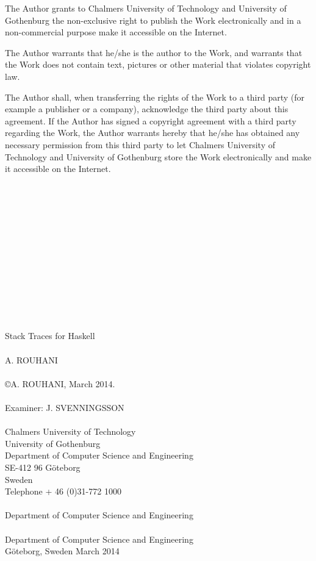 The Author grants to Chalmers University of Technology and University of
Gothenburg the non-exclusive right to publish the Work electronically
and in a non-commercial purpose make it accessible on the Internet.

The Author warrants that he/she is the author to the Work, and warrants
that the Work does not contain text, pictures or other material that
violates copyright law.

The Author shall, when transferring the rights of the Work to a third
party (for example a publisher or a company), acknowledge the third
party about this agreement. If the Author has signed a copyright
agreement with a third party regarding the Work, the Author warrants
hereby that he/she has obtained any necessary permission from this
third party to let Chalmers University of Technology and University of
Gothenburg store the Work electronically and make it accessible on the
Internet. \\
\\
\\
\\
\\
\\
\\
\\
\\
\\
\\
\\
\\
\\
Stack Traces for Haskell \\
\\
A. ROUHANI \\
\\
\copyright A. ROUHANI, March 2014. \\
\\
Examiner: J. SVENNINGSSON \\
\\
Chalmers University of Technology \\
University of Gothenburg \\
Department of Computer Science and Engineering \\
SE-412 96 Göteborg \\
Sweden \\
Telephone + 46 (0)31-772 1000 \\
 \\
Department of Computer Science and Engineering \\
 \\
Department of Computer Science and Engineering \\
Göteborg, Sweden March 2014 \\
